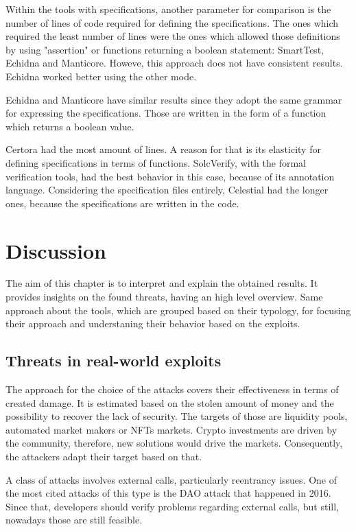 Within the tools with specifications, another parameter for comparison is the number of lines of code required for defining the specifications.
The ones which required the least number of lines were the ones which allowed those definitions by using "assertion" or functions returning a boolean statement: SmartTest, Echidna and Manticore.
Howeve, this approach does not have consistent results. Echidna worked better using the other mode.

Echidna and Manticore have similar results since they adopt the same grammar for expressing the specifications.
Those are written in the form of a function which returns a boolean value.

Certora had the most amount of lines. A reason for that is its elasticity for defining specifications in terms of functions.
SolcVerify, with the formal verification tools, had the best behavior in this case, because of its annotation language.
Considering the specification files entirely, Celestial had the longer ones, because the specifications are written in the code.

\chapter{Discussion}
\label{ch:Discussion}

The aim of this chapter is to interpret and explain the obtained results. 
It provides insights on the found threats, having an high level overview. 
Same approach about the tools, which are grouped based on their typology, for focusing their approach and understaning their behavior based on the exploits.

\section{Threats in real-world exploits}

The approach for the choice of the attacks covers their effectiveness in terms of created damage. 
It is estimated based on the stolen amount of money and the possibility to recover the lack of security. 
The targets of those are liquidity pools, automated market makers or NFTs markets. 
Crypto investments are driven by the community, therefore, new solutions would drive the markets.
Consequently, the attackers adapt their target based on that.

A class of attacks involves external calls, particularly reentrancy issues. 
One of the most cited attacks of this type is the DAO attack that happened in 2016. 
Since that, developers should verify problems regarding external calls, but still, nowadays those are still feasible. 

